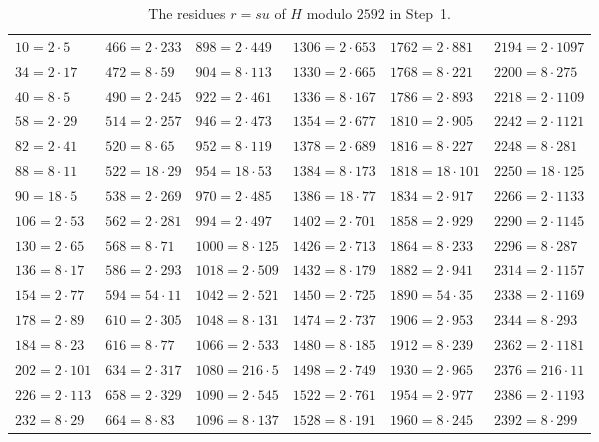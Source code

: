 \documentclass[11pt]{article}
\begin{document}
\begin{table}[ht]
\centering\footnotesize
\caption{The residues $r=su$ of $H$ modulo $2592$ in Step~1.}\label{tab:res}
\begin{tabular}{llllll}
\hline
$10=2\cdot5$ & $466=2\cdot233$ & $898=2\cdot449$ & $1306=2\cdot653$ & $1762=2\cdot881$ & $2194=2\cdot1097$\\
$34=2\cdot17$ & $472=8\cdot59$ & $904=8\cdot113$ & $1330=2\cdot665$ & $1768=8\cdot221$ & $2200=8\cdot275$\\
$40=8\cdot5$ & $490=2\cdot245$ & $922=2\cdot461$ & $1336=8\cdot167$ & $1786=2\cdot893$ & $2218=2\cdot1109$\\
$58=2\cdot29$ & $514=2\cdot257$ & $946=2\cdot473$ & $1354=2\cdot677$ & $1810=2\cdot905$ & $2242=2\cdot1121$\\
$82=2\cdot41$ & $520=8\cdot65$ & $952=8\cdot119$ & $1378=2\cdot689$ & $1816=8\cdot227$ & $2248=8\cdot281$\\
$88=8\cdot11$ & $522=18\cdot29$ & $954=18\cdot53$ & $1384=8\cdot173$ & $1818=18\cdot101$ & $2250=18\cdot125$\\
$90=18\cdot5$ & $538=2\cdot269$ & $970=2\cdot485$ & $1386=18\cdot77$ & $1834=2\cdot917$ & $2266=2\cdot1133$\\
$106=2\cdot53$ & $562=2\cdot281$ & $994=2\cdot497$ & $1402=2\cdot701$ & $1858=2\cdot929$ & $2290=2\cdot1145$\\
$130=2\cdot65$ & $568=8\cdot71$ & $1000=8\cdot125$ & $1426=2\cdot713$ & $1864=8\cdot233$ & $2296=8\cdot287$\\
$136=8\cdot17$ & $586=2\cdot293$ & $1018=2\cdot509$ & $1432=8\cdot179$ & $1882=2\cdot941$ & $2314=2\cdot1157$\\
$154=2\cdot77$ & $594=54\cdot11$ & $1042=2\cdot521$ & $1450=2\cdot725$ & $1890=54\cdot35$ & $2338=2\cdot1169$\\
$178=2\cdot89$ & $610=2\cdot305$ & $1048=8\cdot131$ & $1474=2\cdot737$ & $1906=2\cdot953$ & $2344=8\cdot293$\\
$184=8\cdot23$ & $616=8\cdot77$ & $1066=2\cdot533$ & $1480=8\cdot185$ & $1912=8\cdot239$ & $2362=2\cdot1181$\\
$202=2\cdot101$ & $634=2\cdot317$ & $1080=216\cdot5$ & $1498=2\cdot749$ & $1930=2\cdot965$ & $2376=216\cdot11$\\
$226=2\cdot113$ & $658=2\cdot329$ & $1090=2\cdot545$ & $1522=2\cdot761$ & $1954=2\cdot977$ & $2386=2\cdot1193$\\
$232=8\cdot29$ & $664=8\cdot83$ & $1096=8\cdot137$ & $1528=8\cdot191$ & $1960=8\cdot245$ & $2392=8\cdot299$\\

\end{tabular}
\end{table}
\end{document}

